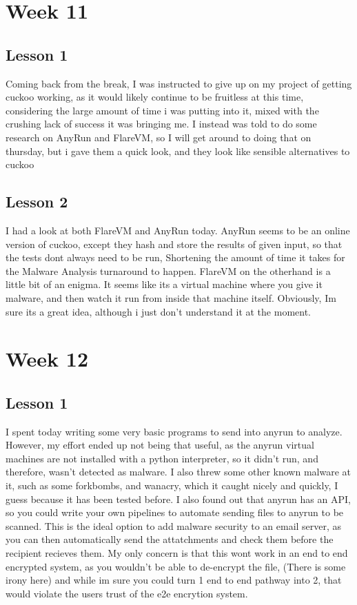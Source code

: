 \documentclass{article}
\begin{document}
\section{Week 11}
\subsection{Lesson 1}
Coming back from the break, I was instructed to give up on my project of getting cuckoo working, as it would likely continue to be fruitless at this time, considering the large amount of time i was putting into it, mixed with the crushing lack of success it was bringing me. I instead was told to do some research on AnyRun and FlareVM, so I will get around to doing that on thursday, but i gave them a quick look, and they look like sensible alternatives to cuckoo

\subsection{Lesson 2}
I had a look at both FlareVM and AnyRun today. AnyRun seems to be an online version of cuckoo, except they hash and store the results of given input, so that the tests dont always need to be run, Shortening the amount of time it takes for the Malware Analysis turnaround to happen. FlareVM on the otherhand is a little bit of an enigma. It seems like its a virtual machine where you give it malware, and then watch it run from inside that machine itself. Obviously, Im sure its a great idea, although i just don't understand it at the moment.

\section{Week 12}
\subsection{Lesson 1}
I spent today writing some very basic programs to send into anyrun to analyze. However, my effort ended up not being that useful, as the anyrun virtual machines are not installed with a python interpreter, so it didn't run, and therefore, wasn't detected as malware. I also threw some other known malware at it, such as some forkbombs, and wanacry, which it caught nicely and quickly, I guess because it has been tested before.  I also found out that anyrun has an API, so you could write your own pipelines to automate sending files to anyrun to be scanned. This is the ideal option to add malware security to an email server, as you can then automatically send the attatchments and check them before the recipient recieves them. My only concern is that this wont work in an end to end encrypted system, as you wouldn't be able to de-encrypt the file, (There is some irony here) and while im sure you could turn 1 end to end pathway into 2, that would violate the users trust of the e2e encrytion system.
\end{document}
